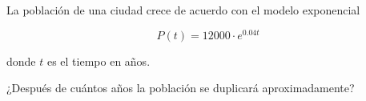 La población de una ciudad crece de acuerdo con el modelo exponencial

\[
P(t) = 12000 \cdot e^{0.04t}
\]

donde \(t\) es el tiempo en años.

¿Después de cuántos años la población se duplicará aproximadamente?